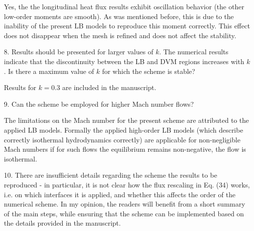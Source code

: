 \documentclass{article}
\begin{document}
Yes, the the longitudinal heat flux results exhibit oscillation behavior
(the other low-order moments are smooth). As was mentioned before,
this is due to the inability of the present LB models to reproduce this moment correctly.
This effect does not disappear when the mesh is refined and does not affect the stability.

\begin{leftbar}
\end{leftbar}

\begin{quoting}
    8. Results should be presented for larger values of
    $k$. The numerical results indicate that the
    discontinuity between the LB and DVM regions increases
    with $k$. Is there a maximum value of $k$ for which
    the scheme is stable?
\end{quoting}

Results for $k=0.3$ are included in the manuscript.

\begin{leftbar}
\end{leftbar}

\begin{quoting}
    9. Can the scheme be employed for higher Mach number flows?
\end{quoting}

The limitations on the Mach number for the present scheme are attributed to the applied LB models.
Formally the applied high-order LB models (which describe correctly isothermal hydrodynamics correctly)
are applicable for non-negligible Mach numbers if for such flows the equilibrium remains non-negative,
the flow is isothermal.

\begin{leftbar}
\end{leftbar}

\begin{quoting}
    10. There are insufficient details regarding the scheme
    the results to be reproduced - in particular, it is not
    clear how the flux rescaling in Eq. (34) works, i.e. on
    which interfaces it is applied, and whether this affects
    the order of the numerical scheme. In my opinion, the
    readers will benefit from a short summary of the main
    steps, while ensuring that the scheme can be implemented
    based on the details provided in the manuscript.
\end{quoting}
\end{document}
